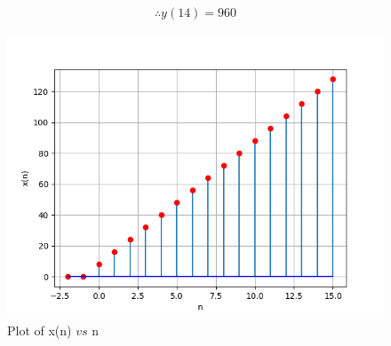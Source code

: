\documentclass[journal,12pt,twocolumn]{IEEEtran}
\theoremstyle{remark}
\begin{document}
\begin{align}
    \therefore \boxed{y(14)=960}
\end{align}
\begin{figure}[ht]
        \centering
        \includegraphics[width=\columnwidth]{figs/a.png}
        \caption{Plot of x(n) $vs$ n}
        \label{fig:10.5.3.13.1}
    \end{figure}
    
\end{document}
